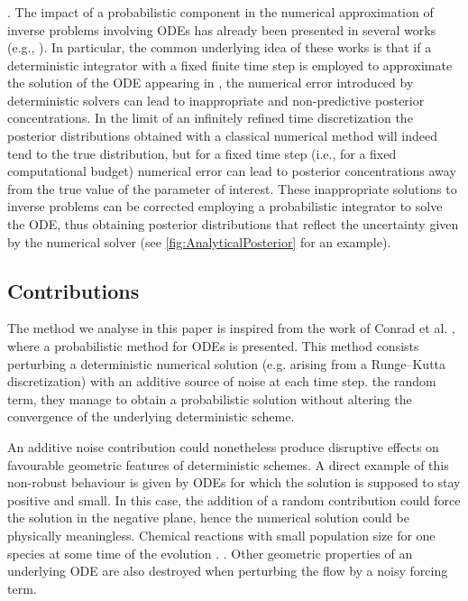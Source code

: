 \documentclass[10pt]{article}
\begin{document}
\subsubsection*{} . The impact of a probabilistic component in the numerical approximation of inverse problems involving ODEs has already been presented in several works (e.g., \cite{CGS17, CCC16, COS17}). In particular, the common underlying idea of these works is that if a deterministic integrator with a fixed finite time step is employed to approximate the solution of the ODE appearing in , the numerical error introduced by deterministic solvers can lead to inappropriate and non-predictive posterior concentrations. In the limit of an infinitely refined time discretization the posterior distributions obtained with a classical numerical method will indeed tend to the true distribution, but for a fixed time step (i.e., for a fixed computational budget) numerical error can lead to posterior concentrations away from the true value of the parameter of interest. These inappropriate solutions to inverse problems can be corrected  employing a probabilistic integrator to solve the ODE, thus obtaining posterior distributions that reflect the uncertainty given by the numerical solver (see \cref{fig:AnalyticalPosterior}  for an example).


\subsection{Contributions} The method we analyse in this paper is inspired from the work of Conrad et al. \cite{CGS17}, where a probabilistic method for ODEs is presented. This method consists  perturbing a deterministic numerical solution (e.g. arising from a Runge--Kutta discretization) with an additive source of noise at each time step.  the random term, they manage to obtain a probabilistic solution without altering the convergence of the underlying deterministic scheme. 

An additive noise contribution could nonetheless produce disruptive effects on favourable geometric features of deterministic schemes. A direct example of this non-robust behaviour is given by ODEs for which the solution is supposed to stay positive and small. In this case, the addition of a random contribution could force the solution in the negative plane, hence the numerical solution could be physically meaningless. Chemical reactions with small population size for one species at some time of the evolution . . Other geometric properties of an underlying ODE are also destroyed when perturbing the flow by a noisy forcing term.
\end{document}
